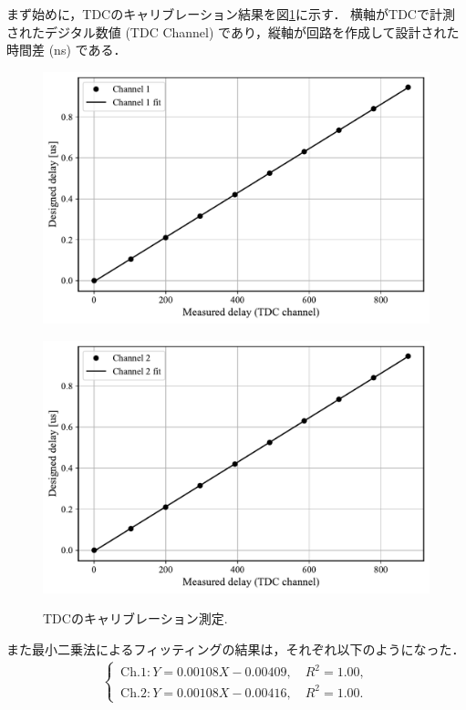 \documentclass[uplatex,dvipdfmx,a4j,12pt]{jsarticle}
\begin{document}
まず始めに，TDCのキャリブレーション結果を図\ref{fig:calibration}に示す．
横軸がTDCで計測されたデジタル数値 (TDC Channel) であり，縦軸が回路を作成して設計された時間差 (ns) である．
\begin{figure}[H]
  \centering
  \begin{minipage}
    {0.85\linewidth}
    \centering
  \includegraphics[width=0.85\linewidth]{analysis/calibration_channel_1.pdf}
    \label{fig:calib1}
  \end{minipage}
  \begin{minipage}
    {0.85\linewidth}
    \centering
  \includegraphics[width=0.85\linewidth]{analysis/calibration_channel_2.pdf}
    \label{fig:calib2}
  \end{minipage}  
  \caption{TDCのキャリブレーション測定.}
  \label{fig:calibration}
\end{figure}

また最小二乗法によるフィッティングの結果は，それぞれ以下のようになった．
\begin{align}
\begin{cases}
\,\mathrm{Ch.1} : Y = 0.00108 X - 0.00409, \quad R^2 = 1.00,\\   
\,\mathrm{Ch.2} : Y = 0.00108 X - 0.00416, \quad R^2 = 1.00.
\end{cases}
\end{align}
\end{document}
